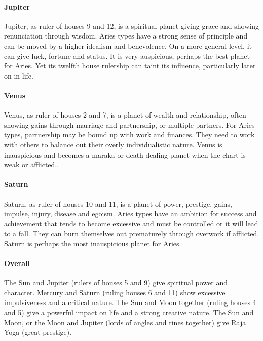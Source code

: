  

\paragraph{Jupiter}

Jupiter, as ruler of houses 9 and 12, is a spiritual planet giving grace and showing renunciation through wisdom. Aries types have a strong sense of principle and can be moved by a higher idealism and benevolence. On a more general level, it can give luck, fortune and status. It is very auspicious, perhaps the best planet for Aries. Yet its twelfth house rulership can taint its influence, particularly later on in life.

 

\paragraph{Venus}

Venus, as ruler of houses 2 and 7, is a planet of wealth and relationship, often showing gains through marriage and partnership, or multiple partners. For Aries types, partnership may be bound up with work and finances. They need to work with others to balance out their overly individualistic nature. Venus is inauspicious and becomes a maraka or death-dealing planet when the chart is weak or afflicted..

 

\paragraph{Saturn}

Saturn, as ruler of houses 10 and 11, is a planet of power, prestige, gains, impulse, injury, disease and egoism. Aries types have an ambition for success and achievement that tends to become excessive and must be controlled or it will lead to a fall. They can burn themselves out prematurely through overwork if afflicted. Saturn is perhaps the most inauspicious planet for Aries.

 

\paragraph{Overall}

The Sun and Jupiter (rulers of houses 5 and 9) give spiritual power and character. Mercury and Saturn (ruling houses 6 and 11) show excessive impulsiveness and a critical nature. The Sun and Moon together (ruling houses 4 and 5) give a powerful impact on life and a strong creative nature. The Sun and Moon, or the Moon and Jupiter (lords of angles and rines together) give Raja Yoga (great prestige).


